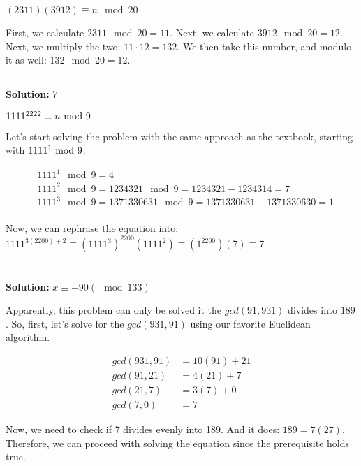 \documentclass{article}
\begin{document}
$(2311)(3912) \equiv n \mod 20$

First, we calculate $2311 \mod 20 = 11$. Next, we calculate $3912 \mod 20 = 12$. Next, we multiply the two: $11 \cdot 12 = 132$. We then take this number, and modulo it as well: $132 \mod 20 = 12$.

\subsection{}

\textbf{Solution: } 7

$1111^{2222} \equiv n \textnormal{ mod } 9$ 

Let's start solving the problem with the same approach as the textbook, starting with $1111^1 \textnormal{ mod } 9$.

\begin{align*}
    &1111^1 \mod 9 = 4 \\
    &1111^2 \mod 9 = 1234321 \mod 9 = 1234321 - 1234314 = 7 \\
    &1111^3 \mod 9 = 1371330631 \mod 9 = 1371330631 - 1371330630 = 1 \\
\end{align*}

Now, we can rephrase the equation into: $1111^{3(2200)+2} \equiv (1111^3)^{2200}(1111^2) \equiv (1^{2200})(7) \equiv 7$

\section{}

\textbf{Solution: } $x \equiv -90(\mod 133)$



Apparently, this problem can only be solved it the $gcd(91, 931)$ divides into $189$. So, first, let's solve for the $gcd(931, 91)$ using our favorite Euclidean algorithm.

\begin{align*}
    gcd(931, 91) &= 10(91) + 21 \\
    gcd(91, 21)  &= 4(21) + 7 \\
    gcd(21, 7)   &= 3(7) + 0 \\
    gcd(7, 0)    &= 7
\end{align*}

Now, we need to check if 7 divides evenly into 189. And it does: $189 = 7(27)$. Therefore, we can proceed with solving the equation since the prerequisite holds true.
\end{document}
